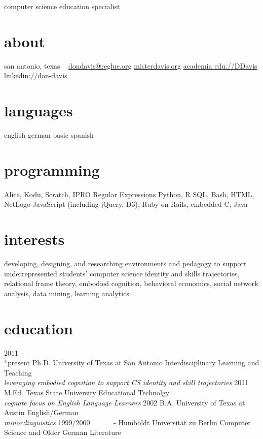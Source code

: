\documentclass[hidelinks]{gnudon}
\begin{document}
       {computer science education specialist}


\begin{aside}
  \section{{\color {orange} abo}ut}
    san antonio, texas
    ~
    \href{mailto:dondavis@reglue.org}{dondavis@reglue.org}
    \href{http://misterdavis.org}{misterdavis.org}
    \href{http://utsa.academia.edu/DDavis}{academia edu://DDavis}
    \href{https://www.linkedin.com/pub/don-davis/4/358/144}{linkedin://don-davis}
  \section{{\color {purple} lang}uages}
    english 
    german
    basic spanish
  \section{{\color {red}prog}ramming}
    Alice, Kodu, Scratch, IPRO
    Regular Expressions
    Python, R
    SQL, Bash, HTML, NetLogo
    JavaScript (including jQuery, D3), Ruby on Rails, embedded C, Java
\end{aside}

\section{interests}
developing, designing, and researching environments and pedagogy to support underrepresented students' computer science identity and skills trajectories, relational frame theory, embodied cognition, behavioral economics, social network analysis, data mining, learning analytics
\section{education}
\begin{entrylist}
  \entry
    {2011 - \\*present}
    {Ph.D. {}}
    {University of Texas at San Antonio}
    {Interdisciplinary Learning and Teaching\\{\emph{\small leveraging embodied cognition to support CS identity and skill trajectories}}}
  \entry
    {2011}
    {M.Ed.}
    {Texas State University}
     {Educational Technolgy \\{\emph{\small cognate focus on English Language Learners}}}
  \entry
    {2002}
    {B.A.} 
    {University of Texas at Austin}
    {English/German\\{\emph{\small minor:linguistics}}}
  \entry
    {1999/2000}
    {\ \ \ \ \ \ - }
    {Humboldt Universität zu Berlin}
    {Computer Science and Older German Literature}
\end{entrylist}
\end{document}
